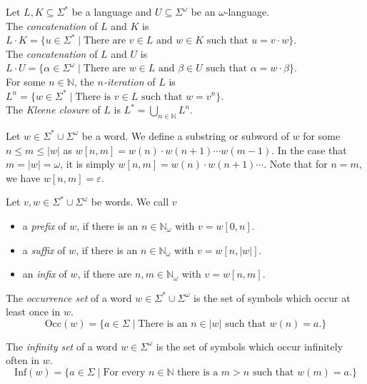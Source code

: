 \begin{defn}
	Let $L, K \subseteq \Sigma^*$ be a language and $U \subseteq \Sigma^\omega$ be an $\omega$-language.\\
	The \emph{concatenation} of $L$ and $K$ is $L \cdot K = \{ u \in \Sigma^* \mid \text{There are } v \in L \text{ and } \allowbreak w \in K \text{ such that } u = v \cdot w\}$.\\
	The \emph{concatenation} of $L$ and $U$ is $L \cdot U = \{ \alpha \in \Sigma^\omega \mid \text{There are } w \in L \text{ and } \allowbreak \beta \in U \text{ such that } \alpha = w \cdot \beta\}$.\\
	For some $n \in \mathbb{N}$, the \emph{$n$-iteration} of $L$ is $L^n = \{ w \in \Sigma^* \mid \text{There is } v \in L \text{ such that } w = v^n\}$.\\
	The \emph{Kleene closure} of $L$ is $L^* = \bigcup\limits_{n \in \mathbb{N}} L^n$.\\
\end{defn}

\begin{defn}
	Let $w \in \Sigma^* \cup \Sigma^\omega$ be a word. We define a substring or subword of $w$ for some $n \leq m \leq |w|$ as $w[n, m] = w(n) \cdot w(n+1) \cdots w(m-1)$. In the case that $m = |w| = \omega$, it is simply $w[n, m] = w(n) \cdot w(n+1) \cdots$. Note that for $n = m$, we have $w[n, m] = \varepsilon$.
\end{defn}

\begin{defn}
	Let $v, w \in \Sigma^* \cup \Sigma^\omega$ be words. We call $v$ 
	\begin{itemize}
		\item a \emph{prefix} of $w$, if there is an $n \in \mathbb{N}_\omega$ with $v = w[0, n]$.
		\item a \emph{suffix} of $w$, if there is an $n \in \mathbb{N}_\omega$ with $v = w[n, |w|]$.
		\item an \emph{infix} of $w$, if there are $n, m \in \mathbb{N}_\omega$ with $v = w[n, m]$.
	\end{itemize}
\end{defn}

\begin{defn}
	The \emph{occurrence set} of a word $w \in \Sigma^* \cup \Sigma^\omega$ is the set of symbols which occur at least once in $w$. 
	$$\text{Occ}(w) = \{ a \in \Sigma \mid \text{There is an } n \in |w| \text{ such that } w(n) = a \text{.}\}$$
	
	The \emph{infinity set} of a word $w \in \Sigma^\omega$ is the set of symbols which occur infinitely often in $w$.
	$$\text{Inf}(w) = \{ a \in \Sigma \mid \text{For every } n \in \mathbb{N} \text{ there is a } m > n \text{ such that } w(m) = a \text{.}\}$$
\end{defn}


